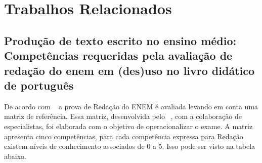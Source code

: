 \chapter{Trabalhos Relacionados}\label{trab_rela}


\section{Produção de texto escrito no ensino médio: Competências requeridas pela avaliação de redação do enem em (des)uso no livro didático de português}

De acordo com ~\cite{silvio_taynan:2017} a prova de Redação do ENEM é avaliada levando em conta uma matriz de referência. Essa matriz, desenvolvida pelo ~\cite{edital_enem:2016}, com a colaboração de especialistas, foi elaborada com o objetivo de operacionalizar o exame. A matriz apresenta cinco competências, para cada competência expressa para Redação existem níveis de conhecimento associados de 0 a 5. Isso pode ser visto na tabela abaixo.

